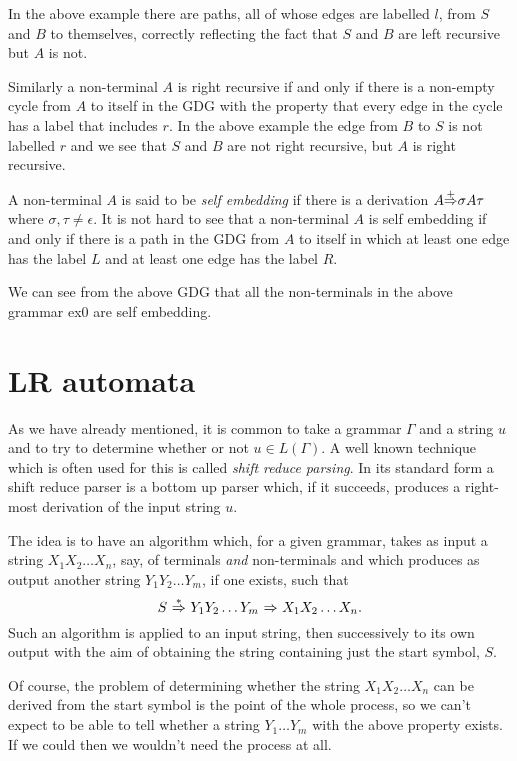 In the above example there are paths, all of whose edges are labelled
$l$, from $S$ and $B$ to themselves, correctly reflecting the fact
that $S$ and $B$ are left recursive but $A$ is not.



Similarly a non-terminal $A$ is right
recursive if and only if there is a non-empty cycle from
$A$ to itself in the GDG with the property that every edge in the
cycle has a label that includes $r$. In the above example the edge
from $B$ to $S$ is not labelled $r$ and we see that $S$ and $B$ are
not right recursive, but $A$ is right recursive.

A non-terminal $A$ is said to be {\em self embedding} if there is a
derivation $A{\mathop{\Rightarrow}\limits^{+}} \sigma A\tau$ where
$\sigma,\tau\not=\epsilon$. It is not hard to see that a non-terminal
$A$ is self embedding if and only if there is a path in the GDG from
$A$ to itself in which at least one edge has the label $L$ and at
least one edge has the label $R$.

We can see from the above GDG that all the non-terminals in the above
grammar ex0 are self embedding.



\chapter{LR automata}\label{lr}

As we have already mentioned, it is common to take a grammar $\Gamma$
and a string $u$ and to try to determine whether or not $u\in
L(\Gamma)$. A well known technique which is often used for this is
called {\em shift reduce parsing}. In its standard form a shift
reduce parser is a bottom up parser which, if it succeeds, produces a
right-most derivation of the input string $u$.

The idea is to have an algorithm which, for a given grammar,
takes as input a string
$X_1X_2\ldots X_n$, say, of terminals {\em and} non-terminals and which
produces as output another string $Y_1Y_2\ldots Y_m$, if one exists,
such that
$$
S\ \derive\ Y_1Y_2\ldots Y_m\ \mderive{}\ X_1X_2\ldots X_n.
$$
Such an algorithm is applied to an input string,
then successively to its own output with the aim of obtaining the string
containing just the start symbol, $S$.

Of course, the problem of determining whether the string $X_1X_2\ldots X_n$
can be derived from the start symbol is the point of the whole
process,
so we can't expect to be able to tell whether a string $Y_1\ldots Y_m$
with the above property exists. If we could then we wouldn't need the 
process at all.

